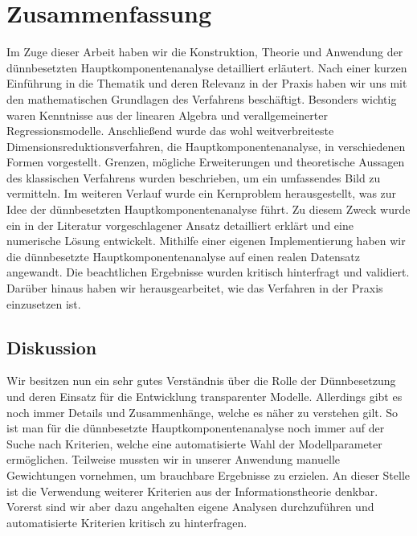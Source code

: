 \chapter{Zusammenfassung}

\label{conclusion}

Im Zuge dieser Arbeit haben wir die Konstruktion, Theorie und Anwendung der dünnbesetzten Hauptkomponentenanalyse detailliert erläutert.
Nach einer kurzen Einführung in die Thematik und deren Relevanz in der Praxis haben wir uns mit den mathematischen Grundlagen des Verfahrens beschäftigt. Besonders wichtig waren Kenntnisse aus der linearen Algebra und verallgemeinerter Regressionsmodelle. Anschließend wurde das wohl weitverbreiteste Dimensionsreduktionsverfahren, die Hauptkomponentenanalyse, in verschiedenen Formen vorgestellt. Grenzen, mögliche Erweiterungen und theoretische Aussagen des klassischen Verfahrens wurden beschrieben, um ein umfassendes Bild zu vermitteln. Im weiteren Verlauf wurde ein Kernproblem herausgestellt, was zur Idee der dünnbesetzten Hauptkomponentenanalyse führt. Zu diesem Zweck wurde ein in der Literatur vorgeschlagener Ansatz detailliert erklärt und eine numerische Lösung entwickelt. Mithilfe einer eigenen Implementierung haben wir die dünnbesetzte Hauptkomponentenanalyse auf einen realen Datensatz angewandt. Die beachtlichen Ergebnisse wurden kritisch hinterfragt und validiert. Darüber hinaus haben wir herausgearbeitet, wie das Verfahren in der Praxis einzusetzen ist.




\section{Diskussion}

Wir besitzen nun ein sehr gutes Verständnis über die Rolle der Dünnbesetzung und deren Einsatz für die Entwicklung transparenter Modelle. Allerdings gibt es noch immer Details und Zusammenhänge, welche es näher zu verstehen gilt. So ist man für die dünnbesetzte Hauptkomponentenanalyse noch immer auf der Suche nach Kriterien, welche eine automatisierte Wahl der Modellparameter ermöglichen. Teilweise mussten wir in unserer Anwendung manuelle Gewichtungen vornehmen, um brauchbare Ergebnisse zu erzielen. An dieser Stelle ist die Verwendung weiterer Kriterien aus der Informationstheorie denkbar. Vorerst sind wir aber dazu angehalten eigene Analysen durchzuführen und automatisierte Kriterien kritisch zu hinterfragen.

